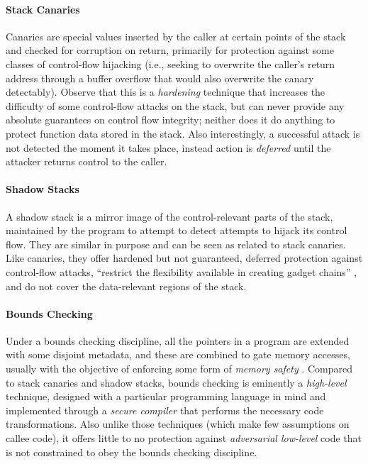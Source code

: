 \paragraph{Stack Canaries}
%
Canaries are special values inserted by the caller at certain points of the
stack and checked for corruption on return, primarily for protection against
some classes of control-flow hijacking (i.e., seeking to overwrite the caller's
return address through a buffer overflow that would also overwrite the canary
detectably).
%
Observe that this is a \emph{hardening} technique that increases the difficulty
of some control-flow attacks on the stack, but can never provide any absolute
guarantees on control flow integrity; neither does it do anything to protect
function data stored in the stack.
%
Also interestingly, a successful attack is not detected the moment it takes
place, instead action is \emph{deferred} until the attacker returns control to
the caller.

\paragraph{Shadow Stacks}
%
A shadow stack is a mirror image of the control-relevant parts of the stack,
maintained by the program to attempt to detect attempts to hijack its control
flow. They are similar in purpose and can be seen as related to stack canaries.
Like canaries, they offer hardened but not guaranteed, deferred protection
against control-flow attacks, ``restrict the flexibility available in creating
gadget chains'' \cite{Shanbhogue+19}, and do not cover the data-relevant regions
of the stack.
%

\paragraph{Bounds Checking}
%
Under a bounds checking discipline, all the pointers in a program are extended
with some disjoint metadata, and these are combined to gate memory accesses,
usually with the objective of enforcing some form of \emph{memory
safety} .
%
Compared to stack canaries and shadow stacks, bounds checking is eminently
a \emph{high-level} technique, designed with a particular programming language
in mind and implemented through a \emph{secure compiler} \cite{} that performs
the necessary code transformations. Also unlike those techniques (which make few
assumptions on callee code), it offers little to no protection
against \emph{adversarial low-level} code that is not constrained to obey the
bounds checking discipline.
%

